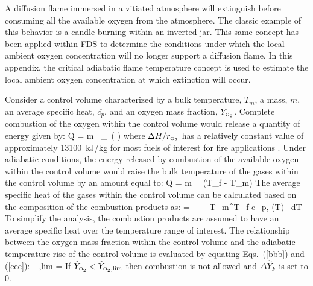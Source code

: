A diffusion flame immersed in a vitiated atmosphere will extinguish before consuming all the
available oxygen from the atmosphere.  The classic example of this behavior is a candle burning
within an inverted jar.  This same concept has been applied within FDS
to determine the conditions under which the local ambient oxygen concentration will no longer
support a diffusion flame.  In this appendix, the critical adiabatic flame temperature
concept is used to estimate the local ambient oxygen concentration at which extinction will
occur.

Consider a control volume characterized
by a bulk temperature, $T_m$, a mass, $m$, an average specific heat, $\overline{c_p}$, and an oxygen mass
fraction, $Y_{\text{\tiny \hbox{O}$_2$}}$.  Complete combustion of the oxygen within the control volume would release a
quantity of energy given by:
\be
   Q = m \, _\OTWO \, \left(   \right)  \label{bbb}
\ee
where $\Delta H/r_{\text{\tiny \hbox{O}$_2$}}$ has a relatively constant value of
approximately 13100~kJ/kg for most fuels of interest for fire applications \cite{Huggett:1}.
Under adiabatic conditions, the energy released by combustion of the available oxygen within
the control volume would raise the bulk temperature of the gases within the control volume by an
amount equal to:
\be
   Q = m \,  \, (T_f - T_m)  \label{eee}
\ee
The average specific heat of the gases within the control volume can be calculated based on the
composition of the combustion products as:
\be
    =  \, \sum_\alpha \int_{T_m}^{T_f} c_{p,\alpha} (T) \, dT
\ee
To simplify the analysis, the combustion products are assumed to have an average specific heat
over the temperature range of interest. The relationship between the oxygen mass fraction within the control volume and the adiabatic
temperature rise of the control volume is evaluated by equating Eqs.~(\ref{bbb}) and (\ref{eee}):
\be
   _{\OTWO,lim} = 
\ee
If $\hat{Y}_{\text{\tiny \hbox{O}$_2$}} < \hat{Y}_{\text{\tiny \hbox{O}$_2$},\lim}$ then combustion is not allowed and  $\Delta \hat{Y}_{F}$ is set to 0.

